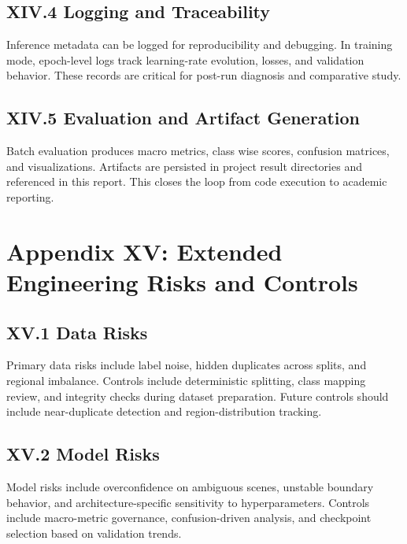 \subsection*{XIV.4 Logging and Traceability}
Inference metadata can be logged for reproducibility and debugging. In training mode, epoch-level logs track learning-rate evolution, losses, and validation behavior. These records are critical for post-run diagnosis and comparative study.

\subsection*{XIV.5 Evaluation and Artifact Generation}
Batch evaluation produces macro metrics, class wise scores, confusion matrices, and visualizations. Artifacts are persisted in project result directories and referenced in this report. This closes the loop from code execution to academic reporting.

\section*{Appendix XV: Extended Engineering Risks and Controls}

\subsection*{XV.1 Data Risks}
Primary data risks include label noise, hidden duplicates across splits, and regional imbalance. Controls include deterministic splitting, class mapping review, and integrity checks during dataset preparation. Future controls should include near-duplicate detection and region-distribution tracking.

\subsection*{XV.2 Model Risks}
Model risks include overconfidence on ambiguous scenes, unstable boundary behavior, and architecture-specific sensitivity to hyperparameters. Controls include macro-metric governance, confusion-driven analysis, and checkpoint selection based on validation trends.

